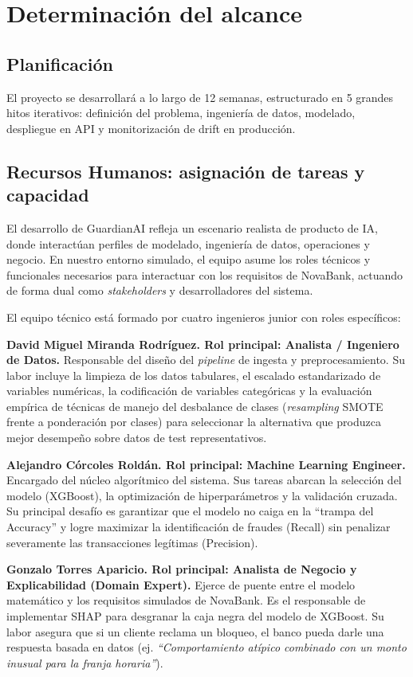 \documentclass[12pt,a4paper]{report}
\begin{document}
\section{Determinación del alcance}

\subsection{Planificación}
El proyecto se desarrollará a lo largo de 12 semanas, estructurado en 5 grandes hitos iterativos: definición del problema, ingeniería de datos, modelado, despliegue en API y monitorización de drift en producción.

\subsection{Recursos Humanos: asignación de tareas y capacidad}
El desarrollo de GuardianAI refleja un escenario realista de producto de IA, donde interactúan perfiles de modelado, ingeniería de datos, operaciones y negocio. En nuestro entorno simulado, el equipo asume los roles técnicos y funcionales necesarios para interactuar con los requisitos de NovaBank, actuando de forma dual como \textit{stakeholders} y desarrolladores del sistema.

El equipo técnico está formado por cuatro ingenieros junior con roles específicos:

\textbf{David Miguel Miranda Rodríguez. Rol principal: Analista / Ingeniero de Datos.}
Responsable del diseño del \textit{pipeline} de ingesta y preprocesamiento. Su labor incluye la limpieza de los datos tabulares, el escalado estandarizado de variables numéricas, la codificación de variables categóricas y la evaluación empírica de técnicas de manejo del desbalance de clases (\textit{resampling} SMOTE frente a ponderación por clases) para seleccionar la alternativa que produzca mejor desempeño sobre datos de test representativos.

\textbf{Alejandro Córcoles Roldán. Rol principal: Machine Learning Engineer.}
Encargado del núcleo algorítmico del sistema. Sus tareas abarcan la selección del modelo (XGBoost), la optimización de hiperparámetros y la validación cruzada. Su principal desafío es garantizar que el modelo no caiga en la ``trampa del Accuracy'' y logre maximizar la identificación de fraudes (Recall) sin penalizar severamente las transacciones legítimas (Precision).

\textbf{Gonzalo Torres Aparicio. Rol principal: Analista de Negocio y Explicabilidad (Domain Expert).}
Ejerce de puente entre el modelo matemático y los requisitos simulados de NovaBank. Es el responsable de implementar SHAP para desgranar la caja negra del modelo de XGBoost. Su labor asegura que si un cliente reclama un bloqueo, el banco pueda darle una respuesta basada en datos (ej. \textit{``Comportamiento atípico combinado con un monto inusual para la franja horaria''}).
\end{document}
